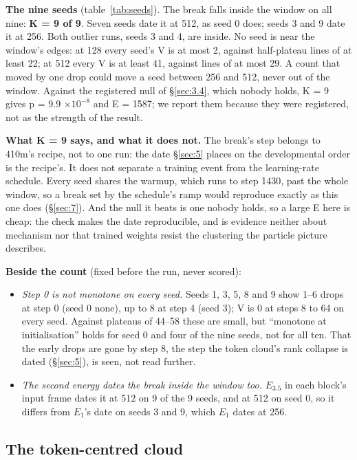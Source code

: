 \documentclass[11pt]{article}
\begin{document}
\textbf{The nine seeds} (table~\ref{tab:seeds}). The break falls inside the window on all nine: \textbf{K = 9 of 9}. Seven seeds date it at 512, as seed 0 does; seeds 3 and 9 date it at 256. Both outlier runs, seeds 3 and 4, are inside. No seed is near the window's edges: at 128 every seed's V is at most 2, against half-plateau lines of at least 22; at 512 every V is at least 41, against lines of at most 29. A count that moved by one drop could move a seed between 256 and 512, never out of the window. Against the registered null of \S\ref{sec:3.4}, which nobody holds, K = 9 gives p = 9.9 $\times 10^{-8}$ and E = 1587; we report them because they were registered, not as the strength of the result.

\textbf{What K = 9 says, and what it does not.} The break's step belongs to 410m's recipe, not to one run: the date \S\ref{sec:5} places on the developmental order is the recipe's. It does not separate a training event from the learning-rate schedule. Every seed shares the warmup, which runs to step 1430, past the whole window, so a break set by the schedule's ramp would reproduce exactly as this one does (\S\ref{sec:7}). And the null it beats is one nobody holds, so a large E here is cheap: the check makes the date reproducible, and is evidence neither about mechanism nor that trained weights resist the clustering the particle picture describes.

\textbf{Beside the count} (fixed before the run, never scored):

\begin{itemize}
  \item \emph{Step 0 is not monotone on every seed.} Seeds 1, 3, 5, 8 and 9 show 1--6 drops at step 0 (seed 0 none), up to 8 at step 4 (seed 3); V is 0 at steps 8 to 64 on every seed. Against plateaus of 44--58 these are small, but ``monotone at initialisation'' holds for seed 0 and four of the nine seeds, not for all ten. That the early drops are gone by step 8, the step the token cloud's rank collapse is dated (\S\ref{sec:5}), is seen, not read further.
  \item \emph{The second energy dates the break inside the window too.} $E_{3.5}$ in each block's input frame dates it at 512 on 9 of the 9 seeds, and at 512 on seed 0, so it differs from $E_{1}$'s date on seeds 3 and 9, which $E_{1}$ dates at 256.
\end{itemize}

\subsection{The token-centred cloud}\label{sec:4.1}
\end{document}
